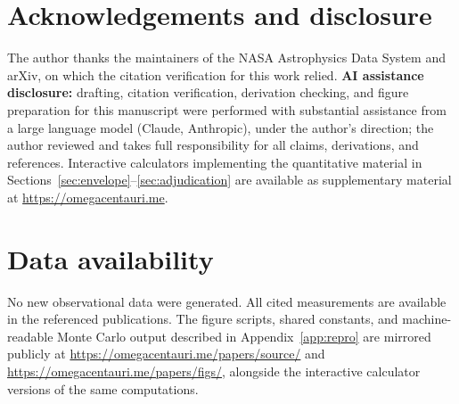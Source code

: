 \documentclass[11pt]{article}
\begin{document}
\section*{Acknowledgements and disclosure}

The author thanks the maintainers of the NASA Astrophysics Data System and arXiv, on which the citation verification for this work relied. \textbf{AI assistance disclosure:} drafting, citation verification, derivation checking, and figure preparation for this manuscript were performed with substantial assistance from a large language model (Claude, Anthropic), under the author's direction; the author reviewed and takes full responsibility for all claims, derivations, and references. Interactive calculators implementing the quantitative material in Sections~\ref{sec:envelope}--\ref{sec:adjudication} are available as supplementary material at \url{https://omegacentauri.me}.

\section*{Data availability}

No new observational data were generated. All cited measurements are available in the referenced publications. The figure scripts, shared constants, and machine-readable Monte Carlo output described in Appendix~\ref{app:repro} are mirrored publicly at \url{https://omegacentauri.me/papers/source/} and \url{https://omegacentauri.me/papers/figs/}, alongside the interactive calculator versions of the same computations.



\end{document}
